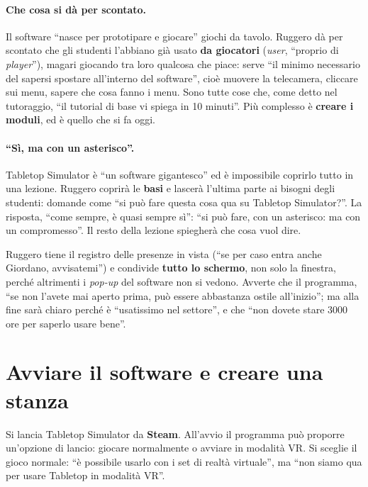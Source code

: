 \paragraph{Che cosa si dà per scontato.} Il software ``nasce per prototipare e
giocare'' giochi da tavolo. Ruggero dà per scontato che gli studenti l'abbiano già
usato \textbf{da giocatori} (\emph{user}, ``proprio di \emph{player}''), magari
giocando tra loro qualcosa che piace: serve ``il minimo necessario del sapersi
spostare all'interno del software'', cioè muovere la telecamera, cliccare sui menu,
sapere che cosa fanno i menu. Sono tutte cose che, come detto nel tutoraggio, ``il
tutorial di base vi spiega in 10 minuti''. Più complesso è \textbf{creare i moduli},
ed è quello che si fa oggi.

\paragraph{``Sì, ma con un asterisco''.} Tabletop Simulator è ``un software
gigantesco'' ed è impossibile coprirlo tutto in una lezione. Ruggero coprirà le
\textbf{basi} e lascerà l'ultima parte ai bisogni degli studenti: domande come ``si
può fare questa cosa qua su Tabletop Simulator?''. La risposta, ``come sempre, è quasi
sempre sì'': ``si può fare, con un asterisco: ma con un compromesso''. Il resto della
lezione spiegherà che cosa vuol dire.

Ruggero tiene il registro delle presenze in vista (``se per caso entra anche Giordano,
avvisatemi'') e condivide \textbf{tutto lo schermo}, non solo la finestra, perché
altrimenti i \emph{pop-up} del software non si vedono. Avverte che il programma, ``se
non l'avete mai aperto prima, può essere abbastanza ostile all'inizio''; ma alla fine
sarà chiaro perché è ``usatissimo nel settore'', e che ``non dovete stare 3000 ore per
saperlo usare bene''.

\section{Avviare il software e creare una stanza}
\label{a8:sec:avvio}

Si lancia Tabletop Simulator da \textbf{Steam}. All'avvio il programma può proporre
un'opzione di lancio: giocare normalmente o avviare in modalità VR. Si sceglie il
gioco normale: ``è possibile usarlo con i set di realtà virtuale'', ma ``non siamo qua
per usare Tabletop in modalità VR''.

